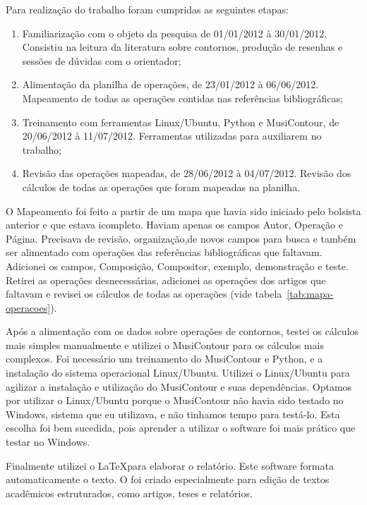 \documentclass[11pt]{article}
\begin{document}
Para realização do trabalho foram cumpridas as seguintes etapas:

\begin{enumerate}
\item Familiarização com o objeto da pesquisa de 01/01/2012 à
  30/01/2012.  Consistiu na leitura da literatura sobre contornos,
  produção de resenhas e sessões de dúvidas com o orientador;
\item Alimentação da planilha de operações, de 23/01/2012 à
  06/06/2012.  Mapeamento de todas as operações contidas nas
  referências bibliográficas;
\item Treinamento com ferramentas Linux/Ubuntu, Python e MusiContour,
  de 20/06/2012 à 11/07/2012.  Ferramentas utilizadas para auxiliarem
  no trabalho;
\item Revisão das operações mapeadas, de 28/06/2012 à 04/07/2012.
  Revisão dos cálculos de todas as operações que foram mapeadas na
  planilha.
\end{enumerate}

O Mapeamento foi feito a partir de um mapa que havia sido iniciado
pelo bolsista anterior e que estava icompleto.
Haviam apenas os campos Autor, Operação e Página.
Precisava de revisão, organização,de novos campos para busca e também
ser alimentado com operações das referências bibliográficas que
faltavam. Adicionei os campos, Composição, Compositor, exemplo,
demonstração e teste. Retirei as operações desnecessárias, adicionei
as operações dos artigos que faltavam e revisei os cálculos de todas
as operações (vide tabela~\ref{tab:mapa-operacoes}).

Após a alimentação com os dados sobre operações de contornos,
testei os cálculos mais simples manualmente e
utilizei o MusiContour para
os cálculos mais complexos.
%
Foi necessário um treinamento do MusiContour e Python, e a instalação do sistema
operacional Linux/Ubuntu. Utilizei o Linux/Ubuntu para agilizar a
instalação e utilização do MusiContour e suas dependências.
Optamos por utilizar o Linux/Ubuntu porque o MusiContour não havia
sido testado no Windows, sistema que eu utilizava, e não tinhamos tempo
para testá-lo. Esta escolha foi bem sucedida, pois aprender
a utilizar o software foi mais prático que testar no Windows.

Finalmente utilizei o \LaTeX para elaborar o relatório. Este software formata
automaticamente o texto. O \Latex foi criado especialmente para edição de
textos acadêmicos estruturados, como artigos, teses e relatórios.
\end{document}
